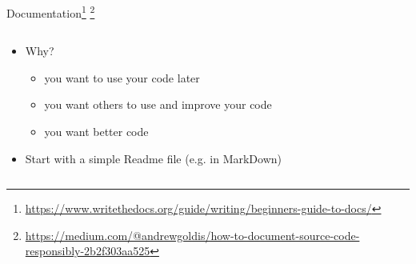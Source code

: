 \documentclass[aspectratio=169,10pt]{beamer}
\begin{document}
\begin{frame}[t,fragile]{Documentation\footnote{\scriptsize \url{https://www.writethedocs.org/guide/writing/beginners-guide-to-docs/}} \footnote{\scriptsize \url{https://medium.com/@andrewgoldis/how-to-document-source-code-responsibly-2b2f303aa525}}}
\vspace{-0.4cm}
    \begin{columns}
        \begin{column}{0.55\paperwidth}
            \begin{itemize}
                \item Why?
                \begin{itemize}
                    \item you want to use your code later
                    \item you want others to use and improve your code %
                    \item you want better code %
                \end{itemize}
                
                \item<2-> Start with a simple Readme file (e.g. in MarkDown)
                

\end{itemize}
\end{column}
\end{columns}
\end{frame}
\end{document}
